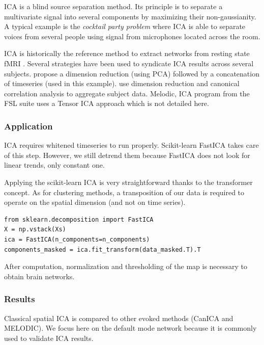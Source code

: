 \documentclass{frontiersSCNS} %
\begin{document}
ICA is a blind source separation method. Its principle is to separate a
multivariate signal into several components by maximizing their non-gaussianity.
A typical example is the \emph{cocktail party problem} where ICA is able to separate
voices from several people using signal from microphones located across the room.

ICA is historically the reference method to extract networks from resting state
fMRI \cite{biswal1999}. Several strategies have been used to syndicate ICA
results across several subjects. \cite{calhoun2001a} propose a dimension
reduction (using PCA) followed by a concatenation of timeseries (used in this
example). \cite{varoquaux2010} use dimension reduction and canonical correlation analysis
to aggregate subject data. Melodic, ICA program from the FSL suite uses a Tensor
ICA approach which is not detailed here.

\subsubsection{Application}

ICA requires whitened timeseries to run properly. Scikit-learn FastICA takes care
of this step. However, we still detrend them because
FastICA does not look for linear trends, only constant one.

Applying the scikit-learn ICA is very straightforward thanks to the transformer
concept. As for clustering methods, a transposition of our data is required to
operate on the spatial dimension (and not on time series).

\begin{lstlisting}
from sklearn.decomposition import FastICA
X = np.vstack(Xs)
ica = FastICA(n_components=n_components)
components_masked = ica.fit_transform(data_masked.T).T
\end{lstlisting}

After computation, normalization and thresholding of the map is necessary to
obtain brain networks.

\subsubsection{Results}

Classical spatial ICA is compared to other evoked methods (CanICA and MELODIC).
We focus here on the default mode network because it is commonly used to
validate ICA results.
\end{document}
